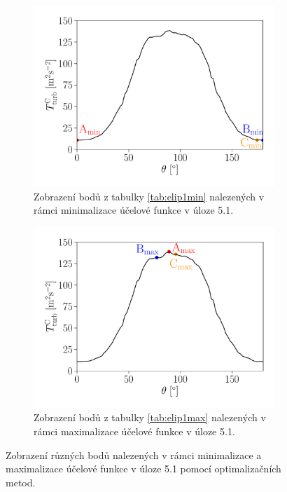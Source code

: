 \begin{figure}[H]
	\vspace{2mm}
	\begin{subfigure}[b]{0.45\textwidth}		
		\centering
		\hspace{-15mm}
		\includegraphics[width=1.19\textwidth]{Images/elip1minpoints.pdf}
		\caption{Zobrazení bodů z tabulky \ref{tab:elip1min} nalezených v rámci minimalizace účelové funkce v úloze 5.1.}
		\label{fig:elip1minbody}
	\end{subfigure}
	\begin{subfigure}[b]{0.12\textwidth}		
		\centering
		\hspace{-19mm}
	\end{subfigure}
	\begin{subfigure}[b]{0.45\textwidth}
		\centering
		\hspace{-15mm}
		\includegraphics[width=1.19\textwidth]{Images/elip1maxpoints.pdf}
		\caption{Zobrazení bodů z tabulky \ref{tab:elip1max} nalezených v rámci maximalizace účelové funkce v úloze 5.1.}
		\label{fig:elip1maxbody}
	\end{subfigure}	
	\caption{Zobrazení různých bodů nalezených v rámci minimalizace a maximalizace účelové funkce v úloze 5.1 pomocí optimalizačních metod.}
	\label{fig:minmax elip1}
\end{figure}



